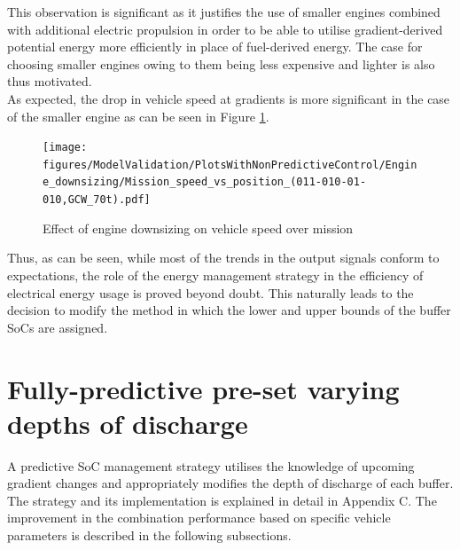 \documentclass[ExampleMasters.tex]{subfiles}
\begin{document}
This observation is significant as it justifies the use of smaller engines combined with additional electric propulsion in order to be able to utilise gradient-derived potential energy more efficiently in place of fuel-derived energy. The case for choosing smaller engines owing to them being less expensive and lighter is also thus motivated.\\
As expected, the drop in vehicle speed at gradients is more significant in the case of the smaller engine as can be seen in Figure \ref{speedEngineDownsizing}.\\
\begin{figure}[h!]
\centering
\texttt{[image: figures/ModelValidation/PlotsWithNonPredictiveControl/Engine\_downsizing/Mission\_speed\_vs\_position\_(011-010-01-010,GCW\_70t).pdf]}
\caption{Effect of engine downsizing on vehicle speed over mission}
\label{speedEngineDownsizing}
\end{figure}
Thus, as can be seen, while most of the trends in the output signals conform to expectations, the role of the energy management strategy in the efficiency of electrical energy usage is proved beyond doubt. This naturally leads to the decision to modify the method in which the lower and upper bounds of the buffer SoCs are assigned.
\section{Fully-predictive pre-set varying depths of discharge}
A predictive SoC management strategy utilises the knowledge of upcoming gradient changes and appropriately modifies the depth of discharge of each buffer. The strategy and its implementation is explained in detail in Appendix C. The improvement in the combination performance based on specific vehicle parameters is described in the following subsections.
\end{document}
